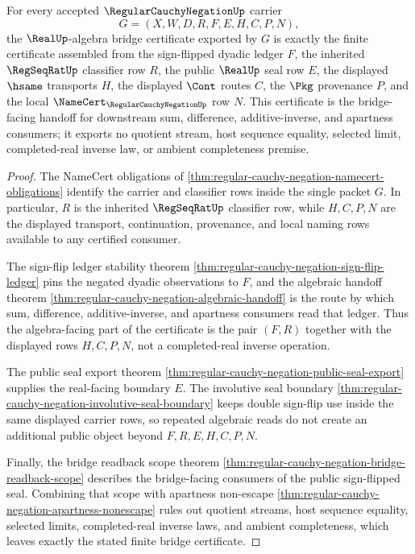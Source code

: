 \begin{theorem}
\label{thm:regular-cauchy-negation-real-algebra-bridge-certificate}
For every accepted $\RegularCauchyNegationUp$ carrier
$$
G=(X,W,D,R,F,E,H,C,P,N),
$$
the $\RealUp$-algebra bridge certificate exported by $G$ is exactly the finite certificate assembled from the sign-flipped dyadic ledger $F$, the inherited $\RegSeqRatUp$ classifier row $R$, the public $\RealUp$ seal row $E$, the displayed $\hsame$ transports $H$, the displayed $\Cont$ routes $C$, the $\Pkg$ provenance $P$, and the local $\NameCert_{\RegularCauchyNegationUp}$ row $N$. This certificate is the bridge-facing handoff for downstream sum, difference, additive-inverse, and apartness consumers; it exports no quotient stream, host sequence equality, selected limit, completed-real inverse law, or ambient completeness premise.
\end{theorem}
\begin{proof}
The NameCert obligations of \autoref{thm:regular-cauchy-negation-namecert-obligations} identify the carrier and classifier rows inside the single packet $G$. In particular, $R$ is the inherited $\RegSeqRatUp$ classifier row, while $H,C,P,N$ are the displayed transport, continuation, provenance, and local naming rows available to any certified consumer.

The sign-flip ledger stability theorem \autoref{thm:regular-cauchy-negation-sign-flip-ledger} pins the negated dyadic observations to $F$, and the algebraic handoff theorem \autoref{thm:regular-cauchy-negation-algebraic-handoff} is the route by which sum, difference, additive-inverse, and apartness consumers read that ledger. Thus the algebra-facing part of the certificate is the pair $(F,R)$ together with the displayed rows $H,C,P,N$, not a completed-real inverse operation.

The public seal export theorem \autoref{thm:regular-cauchy-negation-public-seal-export} supplies the real-facing boundary $E$. The involutive seal boundary \autoref{thm:regular-cauchy-negation-involutive-seal-boundary} keeps double sign-flip use inside the same displayed carrier rows, so repeated algebraic reads do not create an additional public object beyond $F,R,E,H,C,P,N$.

Finally, the bridge readback scope theorem \autoref{thm:regular-cauchy-negation-bridge-readback-scope} describes the bridge-facing consumers of the public sign-flipped seal. Combining that scope with apartness non-escape \autoref{thm:regular-cauchy-negation-apartness-nonescape} rules out quotient streams, host sequence equality, selected limits, completed-real inverse laws, and ambient completeness, which leaves exactly the stated finite bridge certificate.
\end{proof}

